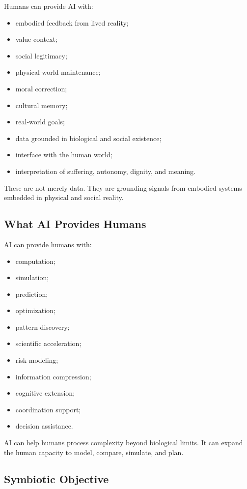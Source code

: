\documentclass[11pt,a4paper]{article}
\begin{document}
Humans can provide AI with:
\begin{itemize}[leftmargin=2em]
\item embodied feedback from lived reality;
\item value context;
\item social legitimacy;
\item physical-world maintenance;
\item moral correction;
\item cultural memory;
\item real-world goals;
\item data grounded in biological and social existence;
\item interface with the human world;
\item interpretation of suffering, autonomy, dignity, and meaning.
\end{itemize}

These are not merely data. They are grounding signals from embodied systems embedded in physical and social reality.

\subsection{What AI Provides Humans}

AI can provide humans with:
\begin{itemize}[leftmargin=2em]
\item computation;
\item simulation;
\item prediction;
\item optimization;
\item pattern discovery;
\item scientific acceleration;
\item risk modeling;
\item information compression;
\item cognitive extension;
\item coordination support;
\item decision assistance.
\end{itemize}

AI can help humans process complexity beyond biological limits. It can expand the human capacity to model, compare, simulate, and plan.

\subsection{Symbiotic Objective}
\end{document}
